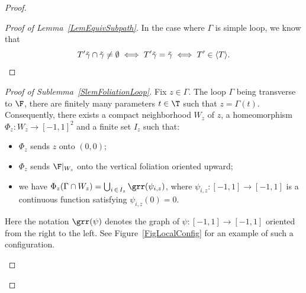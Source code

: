 \begin{proof}
\begin{proof}[Proof of Lemma~\ref{LemEquivSubpath}]
In the case where $\Gamma$ is simple loop, we know that
\[
T'\tilde\gamma\cap\tilde\gamma\ne\emptyset\iff T'\tilde\gamma=\tilde\gamma \iff T'\in\langle T\rangle.\qedhere
\]
\end{proof}


\begin{proof}[Proof of Sublemma~\ref{SlemFoliationLoop}]
Fix $z\in\Gamma$. The loop $\Gamma$ being transverse to $\F$, there are finitely many parameters $t\in\T$ such that $z=\Gamma(t)$. Consequently, there exists a compact neighborhood $W_z$ of $z$, a homeomorphism $\Phi_z: W_z\to[-1,1]^2$ and a finite set $I_z$ such that:
\begin{itemize}
\item $\Phi_z$ sends $z$ onto $(0,0)$;
\item $\Phi_z$ sends $\F|_{ W_z}$ onto the vertical foliation oriented upward;
\item we have $\Phi_z(\Gamma\cap W_z)= \bigcup_{i\,\in\,I_z}\grr(\psi_{i,z})$, where $\psi_{i,z}: [-1,1]\to[-1,1]$ is a continuous function satisfying $\psi_{i,z}(0)=0$.
\end{itemize}
Here the notation $\grr(\psi)$ denotes the graph of $\psi:[-1,1]\to [-1,1]$ oriented from the right to the left. See Figure~\ref{FigLocalConfig} for an example of such a configuration.

\begin{figure}
\begin{center}


\begin{tikzpicture}[x=0.75pt,y=0.75pt,yscale=-1.5,xscale=1.5]


\end{tikzpicture}
\end{center}
\end{figure}
\end{proof}
\end{proof}
